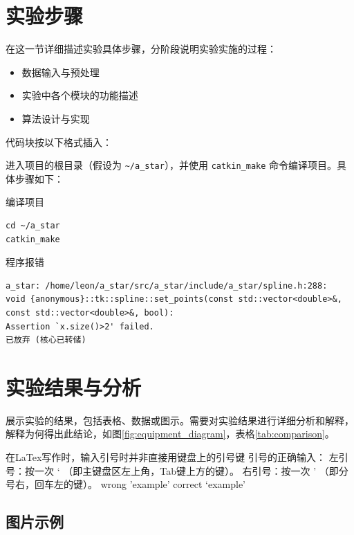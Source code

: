 \documentclass[a4paper]{article}
\begin{document}
\section{实验步骤}

在这一节详细描述实验具体步骤，分阶段说明实验实施的过程：
\begin{itemize}
    \item 数据输入与预处理
    \item 实验中各个模块的功能描述
    \item 算法设计与实现
\end{itemize}

代码块按以下格式插入：

进入项目的根目录（假设为 \texttt{\~{}/a\_star}），并使用 \texttt{catkin\_make} 命令编译项目。具体步骤如下：

\begin{myblock}{编译项目}
\begin{verbatim}
cd ~/a_star
catkin_make
\end{verbatim}
\end{myblock}

\begin{myblock}{程序报错}
\begin{verbatim}
a_star: /home/leon/a_star/src/a_star/include/a_star/spline.h:288: 
void {anonymous}::tk::spline::set_points(const std::vector<double>&, 
const std::vector<double>&, bool): 
Assertion `x.size()>2' failed.
已放弃 (核心已转储)
\end{verbatim}
\end{myblock}

\section{实验结果与分析}

展示实验的结果，包括表格、数据或图示。需要对实验结果进行详细分析和解释，解释为何得出此结论，如图\ref{fig:equipment_diagram}，表格\ref{tab:comparison}。

在LaTex写作时，输入引号时并非直接用键盘上的引号键
引号的正确输入：
左引号：按一次 ` （即主键盘区左上角，Tab键上方的键）。
右引号：按一次 ' （即分号右，回车左的键）。
wrong 'example'
correct `example'

\subsection{图片示例}
\end{document}
